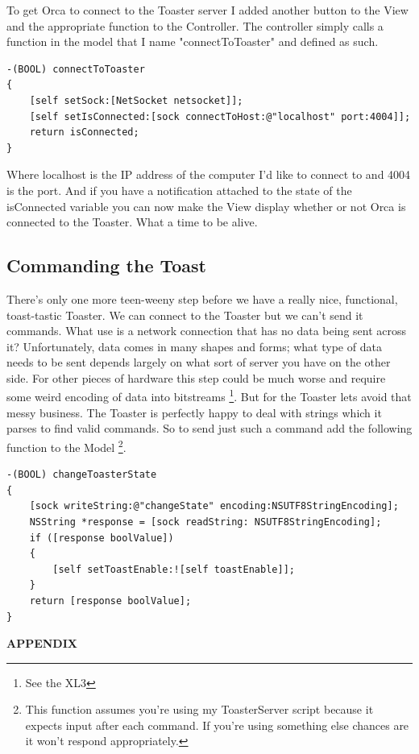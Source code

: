 \documentclass[12pt,a4paper]{article}
\begin{document}
To get Orca to connect to the Toaster server I added another button to the View and the appropriate function to the Controller.
The controller simply calls a function in the model that I name "connectToToaster" and defined as such.
\begin{lstlisting}
-(BOOL) connectToToaster
{
    [self setSock:[NetSocket netsocket]];
    [self setIsConnected:[sock connectToHost:@"localhost" port:4004]];
    return isConnected;
}
\end{lstlisting}
Where localhost is the IP address of the computer I'd like to connect to and 4004 is the port.
And if you have a notification attached to the state of the isConnected variable you can now make the View display whether or not Orca is connected to the Toaster. 
What a time to be alive.
\subsection{Commanding the Toast}
There's only one more teen-weeny step before we have a really nice, functional, toast-tastic Toaster.
We can connect to the Toaster but we can't send it commands.
What use is a network connection that has no data being sent across it?
Unfortunately, data comes in many shapes and forms; what type of data needs to be sent depends largely on what sort of server you have on the other side.
For other pieces of hardware this step could be much worse and require some weird encoding of data into bitstreams
\footnote{See the XL3}.
But for the Toaster lets avoid that messy business. 
The Toaster is perfectly happy to deal with strings which it parses to find valid commands.
So to send just such a command add the following function to the Model
\footnote{This function assumes you're using my ToasterServer script because it expects input after each command. If you're using something else chances are it won't respond appropriately.}.
\begin{lstlisting}
-(BOOL) changeToasterState
{
    [sock writeString:@"changeState" encoding:NSUTF8StringEncoding];
    NSString *response = [sock readString: NSUTF8StringEncoding];
    if ([response boolValue])
    {
        [self setToastEnable:![self toastEnable]];
    }
    return [response boolValue];
}
\end{lstlisting}




  



\newpage
    \begin{center}
      {\bf APPENDIX}
    \end{center}
    
\end{document}
